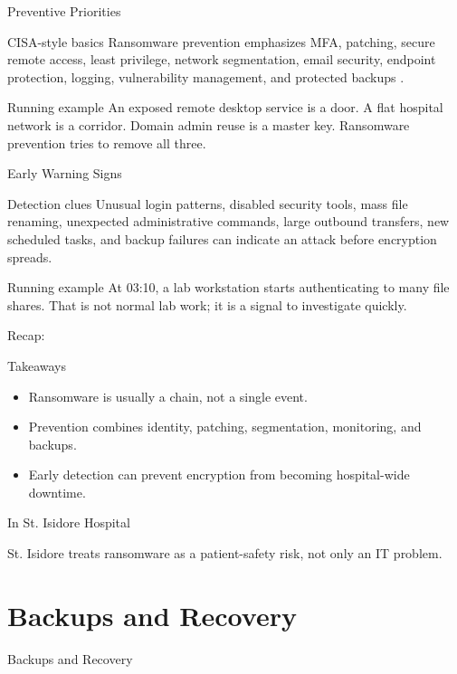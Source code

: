 \documentclass[presentation]{beamer}
\newcommand{\sectiontitleframe}[1]{
\begin{frame}[plain,c]
\begin{center}
{\usebeamerfont{title}\usebeamercolor[fg]{title}#1}
\end{center}
\end{frame}
}
\newcommand{\scenario}{St. Isidore Hospital}
\newcommand{\takeawaysframe}[2]{
\begin{frame}[c]{Recap: \insertsection}
\begin{block}{Takeaways}
#1
\end{block}
\begin{exampleblock}{In \scenario}
#2
\end{exampleblock}
\end{frame}
}
\begin{document}
\begin{frame}[c]{Preventive Priorities}
\begin{block}{CISA-style basics}
Ransomware prevention emphasizes MFA, patching, secure remote access, least privilege, network
segmentation, email security, endpoint protection, logging, vulnerability management, and protected
backups \cite{cisa_stopransomware}.
\end{block}

\begin{exampleblock}{Running example}
An exposed remote desktop service is a door. A flat hospital network is a corridor. Domain admin
reuse is a master key. Ransomware prevention tries to remove all three.
\end{exampleblock}
\end{frame}

\begin{frame}[c]{Early Warning Signs}
\begin{block}{Detection clues}
Unusual login patterns, disabled security tools, mass file renaming, unexpected administrative
commands, large outbound transfers, new scheduled tasks, and backup failures can indicate an attack
before encryption spreads.
\end{block}

\begin{exampleblock}{Running example}
At 03:10, a lab workstation starts authenticating to many file shares. That is not normal lab work;
it is a signal to investigate quickly.
\end{exampleblock}
\end{frame}

\takeawaysframe{
\begin{itemize}
    \item Ransomware is usually a chain, not a single event.
    \item Prevention combines identity, patching, segmentation, monitoring, and backups.
    \item Early detection can prevent encryption from becoming hospital-wide downtime.
\end{itemize}
}{
St. Isidore treats ransomware as a patient-safety risk, not only an IT problem.
}

\section{Backups and Recovery}
\sectiontitleframe{Backups and Recovery}
\end{document}
